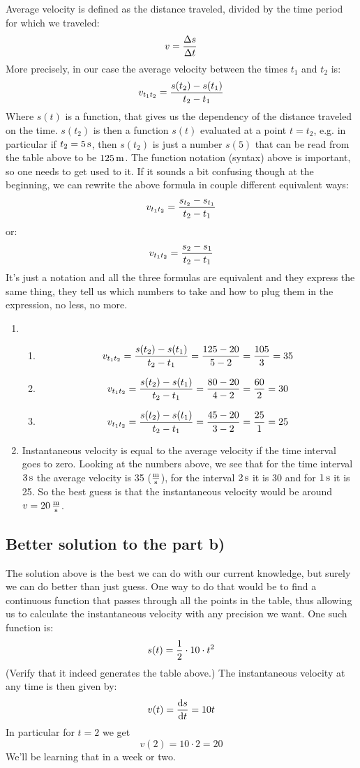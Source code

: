 \documentclass[10pt]{article}
\begin{document}
Average velocity is defined as the distance traveled, divided by the time
period for which we traveled:
$$v={\Delta s\over\Delta t}$$
More precisely, in our case the average velocity between the times $t_1$ and
$t_2$ is:
$$v_{t_1t_2} = {s(t_2)-s(t_1)\over t_2-t_1}$$
Where $s(t)$ is a function, that gives us the dependency of the distance
traveled on the time. $s(t_2)$ is then a function $s(t)$ evaluated at a point
$t=t_2$, e.g. in particular if $t_2=5\rm\,s$, then $s(t_2)$ is just a number
$s(5)$ that can be read from the table above to be $125\rm\,m$. The function
notation (syntax) above is important, so one needs to get used to it. If it
sounds a bit confusing though at the beginning, we can rewrite the above formula in couple different
equivalent ways:
$$v_{t_1t_2} = {s_{t_2}-s_{t_1}\over t_2-t_1}$$
or:
$$v_{t_1t_2} = {s_2-s_1\over t_2-t_1}$$
It's just a notation and all the three formulas are equivalent and they express
the same thing, they tell us which numbers to take and how to plug them in the
expression, no less, no more.
\begin{enumerate}
\item
\begin{enumerate}
\item $$v_{t_1t_2} = {s(t_2)-s(t_1)\over t_2-t_1}={125-20\over5-2}=
{105\over3}=35$$
\item $$v_{t_1t_2} = {s(t_2)-s(t_1)\over t_2-t_1}={80-20\over4-2}=
{60\over2}=30$$
\item $$v_{t_1t_2} = {s(t_2)-s(t_1)\over t_2-t_1}={45-20\over3-2}=
{25\over1}=25$$
\end{enumerate}
\item Instantaneous velocity is equal to the average velocity if the time
interval goes to zero. Looking at the numbers above, we see that for the time
interval $3\rm\,s$ the average velocity is 35 ($\rm m\over s$), for the
interval $2\rm\,s$ it is 30 and for $1\rm\,s$ it is 25. So the best guess is
that the instantaneous velocity would be around $v=20\rm\,{m\over s}$.
\end{enumerate}

\subsection*{Better solution to the part b)}

The solution above is the best we can do with our current knowledge, but surely
we can do better than just guess. One way to do that would be to find a
continuous function that passes through all the points in the table, thus
allowing us to calculate the instantaneous velocity with any precision we want.
One such function is:
$$s(t) = {1\over 2}\cdot10\cdot t^2$$
(Verify that it indeed generates the table above.) The instantaneous velocity at
any time is then given by:
$$v(t) = {{\rm d} s\over{\rm d} t} = 10t$$
In particular for $t=2$ we get
$$v(2) = 10\cdot 2 = 20$$
We'll be learning that in a week or two.
\end{document}
